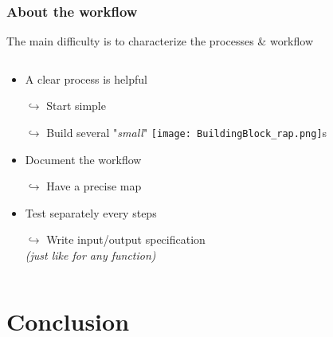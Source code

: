 \documentclass[xcolor=x11names,compress]{beamer}
\renewcommand{\(}{\begin{columns}}
\renewcommand{\)}{\end{columns}}
\newcommand{\<}[1]{\begin{column}{#1}}
\renewcommand{\>}{\end{column}}
\begin{document}
\begin{frame}
\frametitle{About the workflow}
The main difficulty is to characterize the processes \& workflow
\pause
\begin{columns}[t]
 \begin{column}{0.7\textwidth}
 \begin{itemize}[<+->]
        \item A clear process is helpful
        \item[$\hookrightarrow$] Start simple 
        \item[$\hookrightarrow$] Build several "\emph{small}" 
        \texttt{[image: BuildingBlock\_rap.png]}s
        \item Document the workflow
        \item[$\hookrightarrow$] Have a precise map 
        \item Test separately every steps
        \item[$\hookrightarrow$] Write input/output specification \\
        \emph{(just like for any function)}
    \end{itemize}
 \end{column}
  \begin{column}{0.3\textwidth}
    \begin{center}
    \begin{itemize}
    \end{itemize}
    \end{center}
  \end{column}
\end{columns}
\end{frame}

\section{Conclusion}
\end{document}
